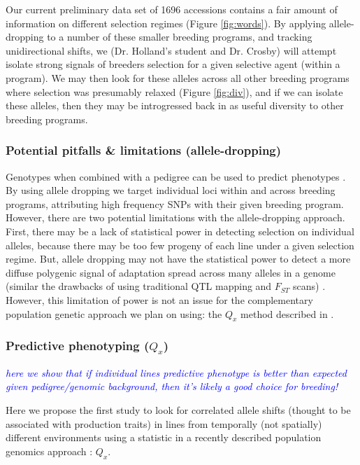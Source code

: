 \documentclass[final,12pt]{article}
\newcommand{\jri}[1]{\textcolor{blue}{ \emph{\scriptsize  #1}} }
\begin{document}
Our current preliminary data set of 1696 accessions contains a fair amount of information on different selection regimes (Figure \ref{fig:words}). 
By applying allele-dropping to a number of these smaller breeding programs, and tracking unidirectional shifts, we (Dr. Holland's student and Dr. Crosby) will attempt isolate strong signals of breeders selection for a given selective agent (within a program). 
We may then look for these alleles across all other breeding programs where selection was presumably relaxed (Figure \ref{fig:div}), and if we can isolate these alleles, then they may be introgressed back in as useful diversity to other breeding programs.

\subsubsection*{Potential pitfalls \& limitations (allele-dropping)}
Genotypes when combined with a pedigree can be used to predict phenotypes \citep{de2009predicting,crossa2010prediction,Decker:2012kd}.
By using allele dropping we target individual loci within and across breeding programs, attributing high frequency SNPs with their given breeding program. 
However, there are two potential limitations with the allele-dropping approach. First, there may be a lack of statistical power in detecting selection on individual alleles, because there may be too few progeny of each line under a given selection regime. 
But, allele dropping may not have the statistical power to detect a more diffuse polygenic signal of adaptation spread across many alleles in a genome (similar the drawbacks of using traditional QTL mapping and $F_{ST}$ scans) \cite{Rockman:2011ej, Berg:2014bs}. 
However, this limitation of power is not an issue for the complementary population genetic approach we plan on using: the $Q_{x}$ method described in \cite{Berg:2014bs}. 

\subsubsection*{Predictive phenotyping ($Q_{x}$)}
\jri{here we show that if individual lines predictive phenotype is better than expected given pedigree/genomic background, then it's likely a good choice for breeding! }

Here we propose the first study to look for correlated allele shifts (thought to be associated with production traits) in lines from temporally (not spatially) different environments using a statistic in a recently described population genomics approach \cite{Berg:2014bs}: $Q_{x}$. 
\end{document}

